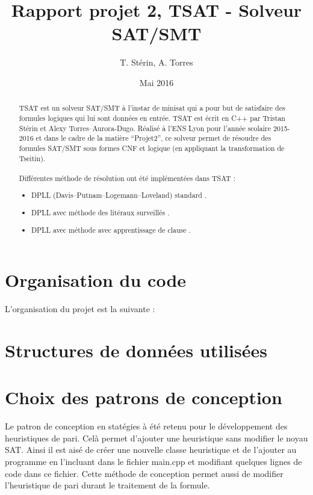 \documentclass{article}
\title{Rapport projet 2, TSAT - Solveur SAT/SMT}
\author{T. Stérin, A. Torres}
\date{Mai 2016}
\newcommand{\litt}{\alpha}
\newcommand{\non}[1]{\overline{#1}}
\begin{document}
\maketitle

\begin{abstract}
TSAT est un solveur SAT/SMT à l'instar de minisat \cite{minisat} qui a pour but de satisfaire des formules logiques qui lui sont données en entrée.
TSAT est écrit en C++ par Tristan Stérin et Alexy Torres--Aurora-Dugo.
Réalisé à l'ENS Lyon pour l'année scolaire 2015-2016 et dans le cadre de la matière ``Projet2'', ce solveur permet de résoudre des formules SAT/SMT sous formes CNF et logique (en appliquant la transformation de Tseitin).
\\ \\
Différentes méthode de résolution ont été implémentées dans TSAT : 
\begin{itemize}
	\item DPLL (Davis–Putnam–Logemann–Loveland) standard \cite{DPLL}.
	\item DPLL avec méthode des litéraux surveillés \cite{WL}.
	\item DPLL avec méthode avec apprentissage de clause \cite{CL}.
\end{itemize}
\end{abstract}

\section{Organisation du code}
L'organisation du projet est la suivante :
\section{Structures de données utilisées}

\section{Choix des patrons de conception}
Le patron de conception en statégies à été retenu pour le développement des heuristiques de pari. Celà permet d'ajouter une heuristique sans modifier le noyau SAT. Ainsi il est aisé de créer une nouvelle classe heuristique et de l'ajouter au programme en l'incluant dans le fichier main.cpp et modifiant quelques lignes de code dans ce fichier.
Cette méthode de conception permet aussi de modifier l'heuristique de pari durant le traitement de la formule.
\end{document}
